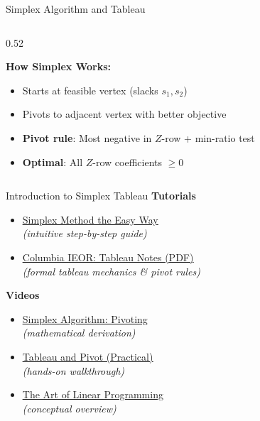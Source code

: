 \documentclass{beamer}
\begin{document}
\begin{frame}{Simplex Algorithm and Tableau}
\begin{columns}[T]
\begin{column}{0.52\textwidth}
    \vspace{0.2cm}
    {\scriptsize
    \textbf{How Simplex Works:}
    \begin{itemize}
      \item Starts at feasible vertex (slacks $s_1, s_2$)
      \item Pivots to adjacent vertex with better objective
      \item \textbf{Pivot rule}: Most negative in $Z$-row + min-ratio test
      \item \textbf{Optimal}: All $Z$-row coefficients $\geq 0$
    \end{itemize}}
  \end{column}
\end{columns}

\end{frame}



\begin{frame}{Introduction to Simplex Tableau}
    \small
    \textbf{Tutorials}
    \begin{itemize}
        \item \href{https://vijayasriiyer.medium.com/simplex-method-the-easy-way-f19e61095ac7}{\underline{Simplex Method the Easy Way}} \\
        \textit{(intuitive step-by-step guide)}
        \item \href{https://www.columbia.edu/~cs2035/courses/ieor3608.F02/tableaunotes2.pdf}{\underline{Columbia IEOR: Tableau Notes (PDF)}} \\
        \textit{(formal tableau mechanics \& pivot rules)}
    \end{itemize}
    
    \vspace{0.3cm}
    \textbf{Videos}
    \begin{itemize}
        \item \href{https://www.youtube.com/watch?v=VbQU59a4XxA}{\underline{Simplex Algorithm: Pivoting}} \\
        \textit{(mathematical derivation)}
        \item \href{https://www.youtube.com/watch?v=9YKLXFqCy6E}{\underline{Tableau and Pivot (Practical)}} \\
        \textit{(hands-on walkthrough)}
        \item \href{https://www.youtube.com/watch?v=E72DWgKP_1Y}{\underline{The Art of Linear Programming}} \\
        \textit{(conceptual overview)}
    \end{itemize}
\end{frame}
\end{document}

